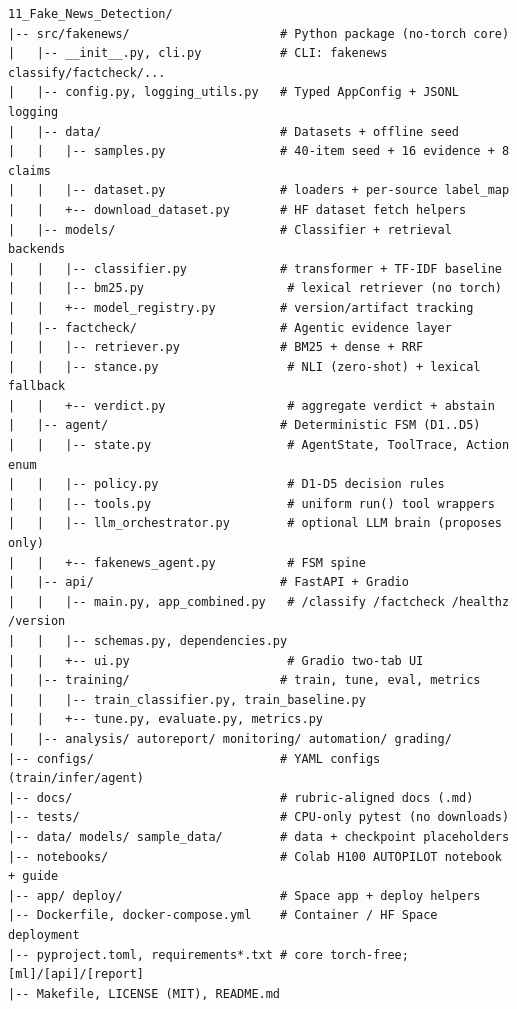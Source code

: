 \documentclass[12pt,a4paper]{article}
\begin{document}
\begin{lstlisting}[basicstyle=\ttfamily\footnotesize]
11_Fake_News_Detection/
|-- src/fakenews/                     # Python package (no-torch core)
|   |-- __init__.py, cli.py           # CLI: fakenews classify/factcheck/...
|   |-- config.py, logging_utils.py   # Typed AppConfig + JSONL logging
|   |-- data/                         # Datasets + offline seed
|   |   |-- samples.py                # 40-item seed + 16 evidence + 8 claims
|   |   |-- dataset.py                # loaders + per-source label_map
|   |   +-- download_dataset.py       # HF dataset fetch helpers
|   |-- models/                       # Classifier + retrieval backends
|   |   |-- classifier.py             # transformer + TF-IDF baseline
|   |   |-- bm25.py                    # lexical retriever (no torch)
|   |   +-- model_registry.py         # version/artifact tracking
|   |-- factcheck/                    # Agentic evidence layer
|   |   |-- retriever.py              # BM25 + dense + RRF
|   |   |-- stance.py                  # NLI (zero-shot) + lexical fallback
|   |   +-- verdict.py                 # aggregate verdict + abstain
|   |-- agent/                        # Deterministic FSM (D1..D5)
|   |   |-- state.py                   # AgentState, ToolTrace, Action enum
|   |   |-- policy.py                  # D1-D5 decision rules
|   |   |-- tools.py                   # uniform run() tool wrappers
|   |   |-- llm_orchestrator.py        # optional LLM brain (proposes only)
|   |   +-- fakenews_agent.py          # FSM spine
|   |-- api/                          # FastAPI + Gradio
|   |   |-- main.py, app_combined.py   # /classify /factcheck /healthz /version
|   |   |-- schemas.py, dependencies.py
|   |   +-- ui.py                      # Gradio two-tab UI
|   |-- training/                     # train, tune, eval, metrics
|   |   |-- train_classifier.py, train_baseline.py
|   |   +-- tune.py, evaluate.py, metrics.py
|   |-- analysis/ autoreport/ monitoring/ automation/ grading/
|-- configs/                          # YAML configs (train/infer/agent)
|-- docs/                             # rubric-aligned docs (.md)
|-- tests/                            # CPU-only pytest (no downloads)
|-- data/ models/ sample_data/        # data + checkpoint placeholders
|-- notebooks/                        # Colab H100 AUTOPILOT notebook + guide
|-- app/ deploy/                      # Space app + deploy helpers
|-- Dockerfile, docker-compose.yml    # Container / HF Space deployment
|-- pyproject.toml, requirements*.txt # core torch-free; [ml]/[api]/[report]
|-- Makefile, LICENSE (MIT), README.md
\end{lstlisting}
\end{document}
